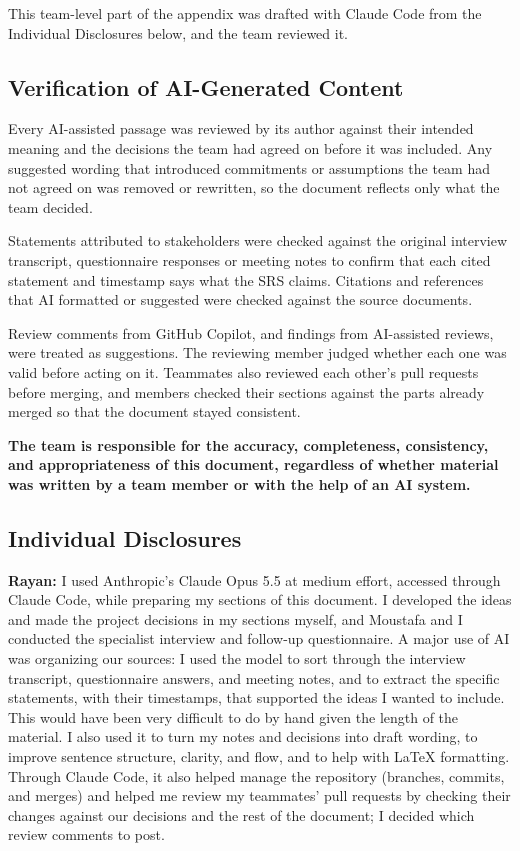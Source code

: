 \documentclass[12pt]{article}
\renewcommand{\_}{\textunderscore\allowbreak}%
\begin{document}
This team-level part of the appendix was drafted with Claude Code from the
Individual Disclosures below, and the team reviewed it.

\subsection{Verification of AI-Generated Content}

Every AI-assisted passage was reviewed by its author against their intended
meaning and the decisions the team had agreed on before it was included.
Any suggested wording that introduced commitments or assumptions the team
had not agreed on was removed or rewritten, so the document reflects only
what the team decided.

Statements attributed to stakeholders were checked against the original
interview transcript, questionnaire responses or meeting notes to confirm
that each cited statement and timestamp says what the SRS claims.
Citations and references that AI formatted or suggested were checked
against the source documents.

Review comments from GitHub Copilot, and findings from AI-assisted reviews,
were treated as suggestions. The reviewing member judged whether each one
was valid before acting on it. Teammates also reviewed each other's pull
requests before merging, and members checked their sections against the
parts already merged so that the document stayed consistent.

\textbf{The team is responsible for the accuracy, completeness,
consistency, and appropriateness of this document, regardless of whether
material was written by a team member or with the help of an AI system.}

\subsection*{Individual Disclosures}

\textbf{Rayan:} I used Anthropic's Claude Opus 5.5 at medium effort, accessed
through Claude Code, while preparing my sections of this document. I developed
the ideas and made the project decisions in my sections myself, and Moustafa and
I conducted the specialist interview and follow-up questionnaire. A major use of
AI was organizing our sources: I used the model to sort through the interview
transcript, questionnaire answers, and meeting notes, and to extract the
specific statements, with their timestamps, that supported the ideas I wanted to
include. This would have been very difficult to do by hand given the length of
the material. I also used it to turn my notes and decisions into draft wording,
to improve sentence structure, clarity, and flow, and to help with \LaTeX{}
formatting. Through Claude Code, it also helped manage the repository (branches,
commits, and merges) and helped me review my teammates' pull requests by
checking their changes against our decisions and the rest of the document; I
decided which review comments to post.
\end{document}
